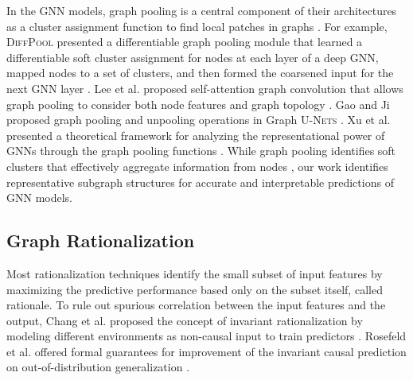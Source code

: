 \documentclass[sigconf]{acmart}
\begin{document}
In the GNN models, graph pooling is a central component of their architectures as a cluster assignment function to find local patches in graphs \cite{mesquita2020rethinking}.
For example, \textsc{DiffPool} presented a differentiable graph pooling module that learned a differentiable soft cluster assignment for nodes at each layer of a deep GNN, mapped nodes to a set of clusters, and then formed the coarsened input for the next GNN layer \cite{ying2018hierarchical}. Lee et al. proposed self-attention graph convolution that allows graph pooling to consider both node features and graph topology \cite{lee2019self}. Gao and Ji proposed graph pooling and unpooling operations in Graph \textsc{U-Nets} \cite{gao2021graph}. Xu et al. presented a theoretical framework for analyzing the representational power of GNNs through the graph pooling functions \cite{xu2018how}. While graph pooling identifies soft clusters that effectively aggregate information from nodes \cite{ying2019gnnexplainer}, our work identifies representative subgraph structures for accurate and interpretable predictions of GNN models.

\subsection{Graph Rationalization}

Most rationalization techniques identify the small subset of input features by maximizing the predictive performance based only on the subset itself, called rationale. To rule out spurious correlation between the input features and the output, Chang et al. proposed the concept of invariant rationalization by modeling different environments as non-causal input to train predictors \cite{chang2020invariant}. Rosefeld et al. offered formal guarantees for improvement of the invariant causal prediction on out-of-distribution generalization \cite{arjovsky2019invariant, rosenfeld2021risks}.
\end{document}
